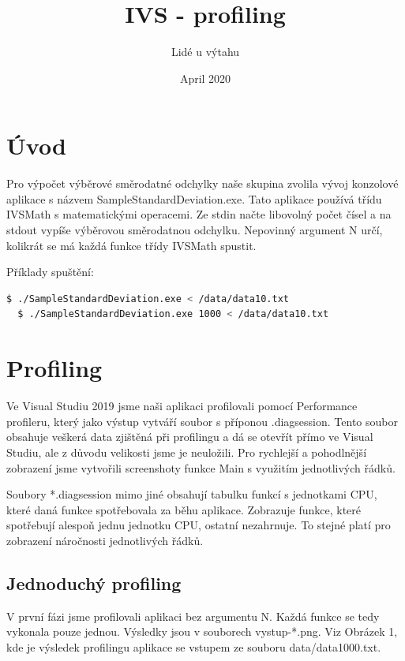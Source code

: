 \documentclass{article}
\title{IVS - profiling}
\author{Lidé u výtahu}
\date{April 2020}
\begin{document}
\maketitle

\tableofcontents

\section{Úvod}
Pro výpočet výběrové směrodatné odchylky naše skupina zvolila vývoj konzolové aplikace s názvem SampleStandardDeviation.exe. Tato aplikace používá třídu IVSMath s matematickými operacemi. Ze stdin načte libovolný počet čísel a na stdout vypíše výběrovou směrodatnou odchylku. Nepovinný argument N určí, kolikrát se má každá funkce třídy IVSMath spustit.

Příklady spuštění:

\begin{lstlisting}[language=bash]
  $ ./SampleStandardDeviation.exe < /data/data10.txt
  $ ./SampleStandardDeviation.exe 1000 < /data/data10.txt
\end{lstlisting}

\section{Profiling}
Ve Visual Studiu 2019 jsme naši aplikaci profilovali pomocí Performance profileru, který jako výstup vytváří soubor s příponou .diagsession. Tento soubor obsahuje veškerá data zjištěná při profilingu a dá se otevřít přímo ve Visual Studiu, ale z důvodu velikosti jsme je neuložili. Pro rychlejší a pohodlnější zobrazení jsme vytvořili screenshoty funkce Main s využitím jednotlivých řádků.

Soubory *.diagsession mimo jiné obsahují tabulku funkcí s jednotkami CPU, které daná funkce spotřebovala za běhu aplikace. Zobrazuje funkce, které spotřebují alespoň jednu jednotku CPU, ostatní nezahrnuje. To stejné platí pro zobrazení náročnosti jednotlivých řádků. 

\subsection{Jednoduchý profiling}
V první fázi jsme profilovali aplikaci bez argumentu N. Každá funkce se tedy vykonala pouze jednou. Výsledky jsou v souborech vystup-*.png. Viz Obrázek 1, kde je výsledek profilingu aplikace se vstupem ze souboru data/data1000.txt.
\end{document}
